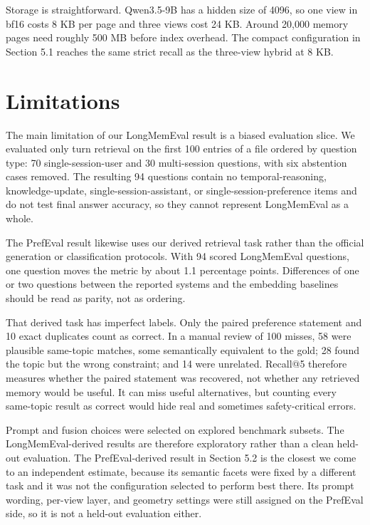 \documentclass[
  10pt,
  letterpaper,
]{article}
\begin{document}
Storage is straightforward. Qwen3.5-9B has a hidden size of 4096, so one
view in bf16 costs 8 KB per page and three views cost 24 KB. Around
20,000 memory pages need roughly 500 MB before index overhead. The
compact configuration in Section 5.1 reaches the same strict recall as
the three-view hybrid at 8 KB.

\section{Limitations}\label{limitations}

The main limitation of our LongMemEval result is a biased evaluation
slice. We evaluated only turn retrieval on the first 100 entries of a
file ordered by question type: 70 single-session-user and 30
multi-session questions, with six abstention cases removed. The
resulting 94 questions contain no temporal-reasoning, knowledge-update,
single-session-assistant, or single-session-preference items and do not
test final answer accuracy, so they cannot represent LongMemEval as a
whole.

The PrefEval result likewise uses our derived retrieval task rather than
the official generation or classification protocols. With 94 scored
LongMemEval questions, one question moves the metric by about 1.1
percentage points. Differences of one or two questions between the
reported systems and the embedding baselines should be read as parity,
not as ordering.

That derived task has imperfect labels. Only the paired preference
statement and 10 exact duplicates count as correct. In a manual review
of 100 misses, 58 were plausible same-topic matches, some semantically
equivalent to the gold; 28 found the topic but the wrong constraint; and
14 were unrelated. Recall@5 therefore measures whether the paired
statement was recovered, not whether any retrieved memory would be
useful. It can miss useful alternatives, but counting every same-topic
result as correct would hide real and sometimes safety-critical errors.

Prompt and fusion choices were selected on explored benchmark subsets.
The LongMemEval-derived results are therefore exploratory rather than a
clean held-out evaluation. The PrefEval-derived result in Section 5.2 is
the closest we come to an independent estimate, because its semantic
facets were fixed by a different task and it was not the configuration
selected to perform best there. Its prompt wording, per-view layer, and
geometry settings were still assigned on the PrefEval side, so it is not
a held-out evaluation either.
\end{document}
